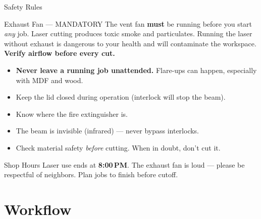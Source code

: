 \documentclass[aspectratio=169]{beamer}
\begin{document}
\begin{frame}{Safety Rules}
\begin{alertblock}{Exhaust Fan --- MANDATORY}
The vent fan \textbf{must} be running before you start \emph{any} job.
Laser cutting produces toxic smoke and particulates.
Running the laser without exhaust is dangerous to your health
and will contaminate the workspace.
\textbf{Verify airflow before every cut.}
\end{alertblock}

\begin{itemize}
    \item \textbf{Never leave a running job unattended.}
        Flare-ups can happen, especially with MDF and wood.
    \item Keep the lid closed during operation (interlock will stop the beam).
    \item Know where the fire extinguisher is.
    \item The beam is invisible (infrared) --- never bypass interlocks.
    \item Check material safety \emph{before} cutting. When in doubt, don't cut it.
\end{itemize}

\begin{block}{Shop Hours}
Laser use ends at \textbf{8:00\,PM}. The exhaust fan is loud ---
please be respectful of neighbors. Plan jobs to finish before cutoff.
\end{block}
\end{frame}

\section{Workflow}
\end{document}

